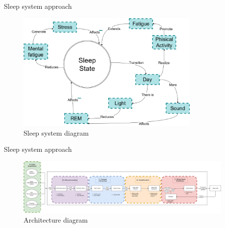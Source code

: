 \documentclass[10pt]{beamer} %
\begin{document}
\begin{frame}{Sleep system approach} %
          \begin{figure}
              \centering
             \includegraphics[width=0.8\textwidth]{figures/simulation.png} %
             \caption{Sleep system diagram} %
             \end{figure}
 
\end{frame}
\begin{frame}{Sleep system approach} %
          \begin{figure}
              \centering
             \includegraphics[width=0.95\textwidth]{figures/system.png} %
             \caption{Architecture diagram} %
             \end{figure}
 
\end{frame}
\end{document}
